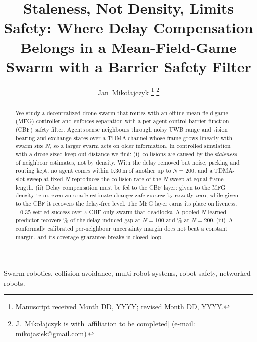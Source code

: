 \documentclass[letterpaper,10pt,journal,twoside]{IEEEtran}
\begin{document}
\title{Staleness, Not Density, Limits Safety: Where Delay Compensation Belongs in a Mean-Field-Game Swarm with a Barrier Safety Filter}

\author{Jan~Miko{\l}ajczyk%
\thanks{Manuscript received Month DD, YYYY; revised Month DD, YYYY.}%
\thanks{J.~Miko{\l}ajczyk is with [affiliation to be completed] (e-mail: mikojasiek@gmail.com).}}

\maketitle

\begin{abstract}
We study a decentralized drone swarm that routes with an offline mean-field-game (MFG) controller and
enforces separation with a per-agent control-barrier-function (CBF) safety filter. Agents sense neighbours
through noisy UWB range and vision bearing and exchange states over a TDMA channel whose frame grows linearly
with swarm size $N$, so a larger swarm acts on older information. In controlled simulation with a
drone-sized keep-out distance we find: (i)~collisions are caused by the \emph{staleness} of neighbour
estimates, not by density. With the delay removed but noise, packing and routing kept, no agent comes within
0.30\,m of another up to $N{=}200$, and a TDMA-slot sweep at fixed $N$ reproduces the collision rate of the
$N$-sweep at equal frame length. (ii)~Delay compensation must be fed to the CBF layer: given to the MFG
density term, even an oracle estimate changes safe success by exactly zero, while given to the CBF it
recovers the delay-free level. The MFG layer earns its place on liveness, $+0.35$ settled success over a
CBF-only swarm that deadlocks. A pooled-$N$ learned predictor recovers \RecHundred\% of the delay-induced
gap at $N{=}100$ and \RecTwoHundred\% at $N{=}200$\Pending. (iii)~A conformally calibrated per-neighbour
uncertainty margin does not beat a constant margin, and its coverage guarantee breaks in closed loop.
\end{abstract}

\begin{IEEEkeywords}
Swarm robotics, collision avoidance, multi-robot systems, robot safety, networked robots.
\end{IEEEkeywords}

\end{document}
